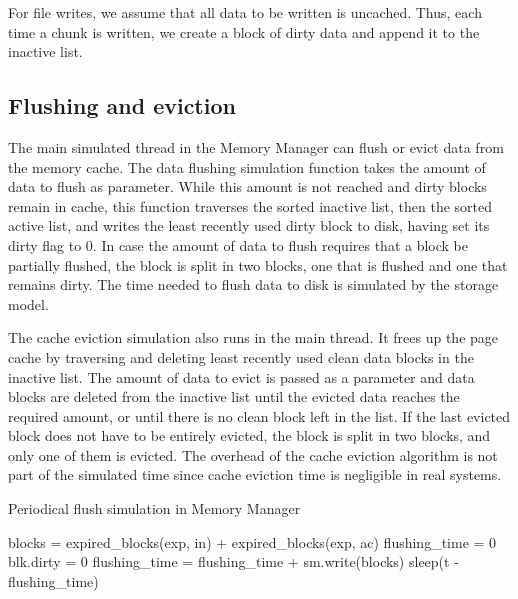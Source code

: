 For file writes, we assume that all data to be written is
uncached. Thus, each time a chunk is written, we create a block of dirty data
and append it to the inactive list.

\subsection{Flushing and eviction}

The main simulated thread in the Memory Manager can flush or evict data from the
memory cache. The data flushing simulation
function takes the amount of data to flush as parameter. While
this amount is not reached and dirty
blocks remain in cache, this function traverses the sorted
inactive list, then the sorted active list, and writes the
least recently used dirty block to disk, having set its dirty
flag to 0. In case the amount of data to flush requires that a
block be partially flushed, the block is split in two blocks,
one that is flushed and one that remains dirty. The time needed
to flush data to disk is simulated by the storage model.

The cache eviction simulation also runs in
the main thread. It frees up the page cache by traversing and deleting
least recently used clean data blocks in the inactive list.
The amount of data to evict is passed as a parameter and data blocks are deleted
from the inactive list until the evicted data reaches the required amount,
or until there is no clean block left in the list.
If the last evicted block does not have to be entirely evicted, the block is split in two blocks,
and only one of them is evicted.
The overhead of the cache eviction algorithm is not part of the simulated time
since cache eviction time is negligible in real systems. %

\begin{algorithm}[b]\caption{Periodical flush simulation in Memory Manager}
\label{alg:pdflush}
    \small
    \begin{algorithmic}[1]
        \Input
           \EndInput
            \State blocks = expired\_blocks(exp, in) + expired\_blocks(exp, ac)
            \State flushing\_time = 0
              \State blk.dirty = 0 
              \State flushing\_time = flushing\_time + sm.write(blocks)
            \EndFor
                \State sleep(t - flushing\_time)
            \EndIf  
        \EndWhile
    \end{algorithmic}
\end{algorithm}

